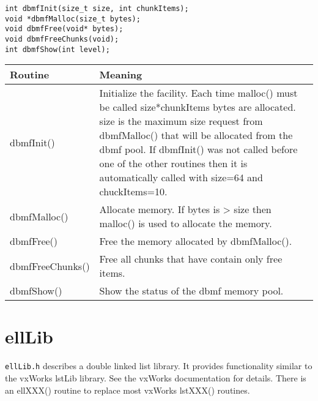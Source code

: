 \begin{verbatim}int dbmfInit(size_t size, int chunkItems);
void *dbmfMalloc(size_t bytes);
void dbmfFree(void* bytes);
void dbmfFreeChunks(void);
int dbmfShow(int level);
\end{verbatim}
\begin{center}\begin{longtable}{p{1.3in}p{5.5in}}
\textbf{Routine} & \textbf{Meaning}\\
\hline
dbmfInit() & Initialize the facility. Each time malloc() must be called size*chunkItems bytes are allocated. size is the maximum size request from dbmfMalloc() that will be allocated from the dbmf pool. If dbmfInit() was not called before one of the other routines then it is automatically called with size=64 and chuckItems=10.\\
dbmfMalloc() & Allocate memory. If bytes is \textgreater{} size then malloc() is used to allocate the memory.\\
dbmfFree() & Free the memory allocated by dbmfMalloc().\\
dbmfFreeChunks() & Free all chunks that have contain only free items.\\
dbmfShow() & Show the status of the dbmf memory pool.
\end{longtable}\end{center}


\section{ellLib}

\verb|ellLib.h| describes a double linked list library. It provides functionality similar to the vxWorks lstLib library. See the 
vxWorks documentation for details. There is an ellXXX() routine to replace most vxWorks lstXXX() routines.

